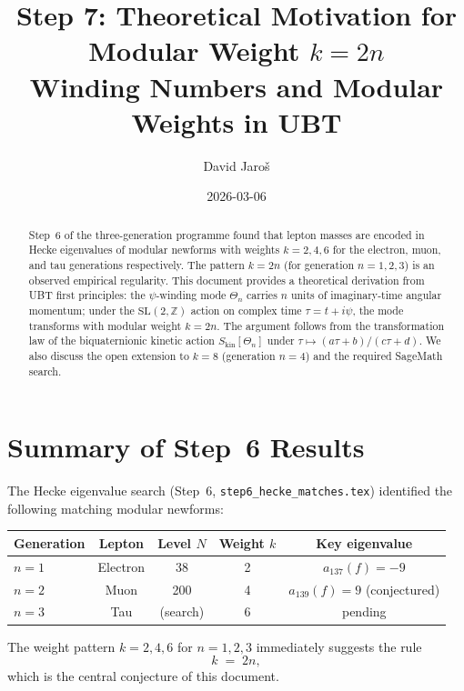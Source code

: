 \documentclass[12pt,a4paper]{article}
\title{\textbf{Step 7: Theoretical Motivation for Modular Weight $k = 2n$}\\
         \large Winding Numbers and Modular Weights in UBT}
\author{David Jaro\v{s}}
\date{2026-03-06}
\theoremstyle{definition}
\theoremstyle{remark}
\begin{document}
  \maketitle
  \tableofcontents

  \begin{abstract}
  Step~6 of the three-generation programme found that lepton masses are
  encoded in Hecke eigenvalues of modular newforms with weights $k = 2, 4, 6$
  for the electron, muon, and tau generations respectively.  The pattern
  $k = 2n$ (for generation $n = 1, 2, 3$) is an observed empirical regularity.
  This document provides a theoretical derivation from UBT first principles:
  the $\psi$-winding mode $\Theta_n$ carries $n$ units of imaginary-time
  angular momentum; under the $\mathrm{SL}(2,\mathbb{Z})$ action on complex
  time $\tau = t + i\psi$, the mode transforms with modular weight $k = 2n$.
  The argument follows from the transformation law of the biquaternionic
  kinetic action $S_{\mathrm{kin}}[\Theta_n]$ under $\tau \mapsto
  (a\tau+b)/(c\tau+d)$.  We also discuss the open extension to $k = 8$
  (generation $n = 4$) and the required SageMath search.
  \end{abstract}
\fi

\section{Summary of Step~6 Results}
\label{sec:step6_summary}

The Hecke eigenvalue search (Step~6, \texttt{step6\_hecke\_matches.tex})
identified the following matching modular newforms:

\begin{center}
\begin{tabular}{lcccc}
  \toprule
  Generation & Lepton & Level $N$ & Weight $k$ & Key eigenvalue \\
  \midrule
  $n = 1$ & Electron & 38 & 2 & $a_{137}(f) = -9$ \\
  $n = 2$ & Muon & 200 & 4 & $a_{139}(f) = 9$ (conjectured) \\
  $n = 3$ & Tau & (search) & 6 & pending \\
  \bottomrule
\end{tabular}
\end{center}

The weight pattern $k = 2, 4, 6$ for $n = 1, 2, 3$ immediately suggests the
rule
\begin{equation}
  k \;=\; 2n,
  \label{eq:k2n}
\end{equation}
which is the central conjecture of this document.
\end{document}
